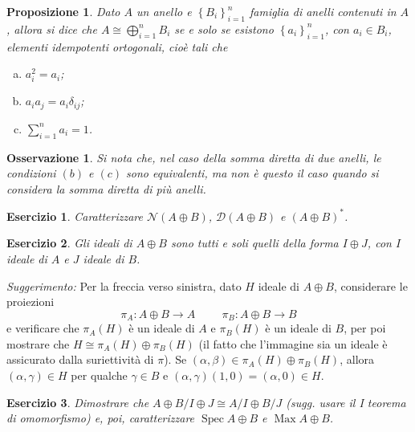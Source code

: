\documentclass[12pt]{scrartcl}
\theoremstyle{style}
\newtheorem{prop}{Proposizione}[section]
\newtheorem{osservazione}{Osservazione}[section]
\theoremstyle{style1}
\newtheorem{esercizio}{Esercizio}[section]
\numberwithin{equation}{subsection}
\begin{document}
\begin{prop}
	Dato $A$ un anello e $\left\{ B_i \right\}_{i=1}^n $ famiglia di anelli contenuti in $A$, allora si dice che $A \cong \bigoplus_{i=1} ^n B_i$ se e solo se esistono $\left\{ a_i \right\} _{i=1} ^n$, con $a_i \in B_i$, elementi idempotenti ortogonali, cio\`e tali che
	\begin{enumerate}[(a).]
		\item $a_i^2 = a_i$;
		\item $a_ia_j = a_i \delta _{ij} $;
		\item $\sum_{i=1}^{n} a_i = 1$.
	\end{enumerate}
\end{prop}
\begin{osservazione}
Si nota che, nel caso della somma diretta di due anelli, le condizioni $(b)$ e $(c)$ sono equivalenti, ma non \`e questo il caso quando si considera la somma diretta di pi\`u anelli.
\end{osservazione}
\begin{esercizio}
Caratterizzare $\mathcal{N} (A \oplus B)$, $\mathcal{D} (A\oplus B)$ e $(A\oplus B)^*$.
\end{esercizio}
\begin{esercizio}
Gli ideali di $A \oplus B$ sono tutti e soli quelli della forma $I \oplus J$, con $I$ ideale di $A$ e $J$ ideale di $B$.
\end{esercizio}
\noindent \textit{Suggerimento:} Per la freccia verso sinistra, dato $H$ ideale di $A\oplus B$, considerare le proiezioni
\[
\pi_A : A \oplus B \to A \hspace{1cm}\pi_B : A\oplus B \to B
\] 
e verificare che $\pi_A(H)$ \`e un ideale di $A$ e $\pi_B(H)$ \`e un ideale di $B$, per poi mostrare che $H \cong \pi_A(H) \oplus \pi_B(H)$ (il fatto che l'immagine sia un ideale \`e assicurato dalla suriettivit\`a di $\pi$).
Se $(\alpha ,\beta ) \in \pi_A(H)\oplus \pi_B(H)$, allora $(\alpha ,\gamma) \in H$ per qualche $\gamma\in B$ e $(\alpha ,\gamma)(1,0) = (\alpha ,0) \in H$.
\begin{esercizio}
Dimostrare che $A \oplus B / I\oplus J \cong A / I \oplus B / J$ (sugg. usare il I teorema di omomorfismo) e, poi, caratterizzare $\operatorname{Spec} A\oplus B$ e $\operatorname{Max} A \oplus B$.
\end{esercizio}
\end{document}
